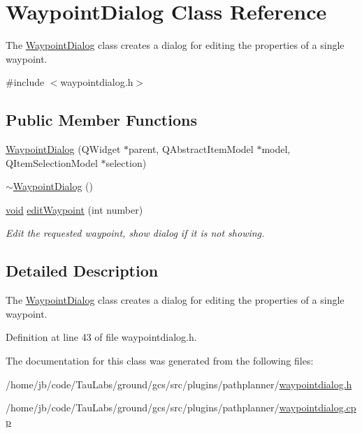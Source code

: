\hypertarget{class_waypoint_dialog}{\section{\-Waypoint\-Dialog \-Class \-Reference}
\label{class_waypoint_dialog}
}


\-The \hyperlink{class_waypoint_dialog}{\-Waypoint\-Dialog} class creates a dialog for editing the properties of a single waypoint.  




{\ttfamily \#include $<$waypointdialog.\-h$>$}

\subsection*{\-Public \-Member \-Functions}
\begin{DoxyCompactItemize}
\item 
\hyperlink{group___path_planner_ga79559741b9fcf0a36768f7df92746760}{\-Waypoint\-Dialog} (\-Q\-Widget $\ast$parent, \-Q\-Abstract\-Item\-Model $\ast$model, \-Q\-Item\-Selection\-Model $\ast$selection)
\item 
\hyperlink{group___path_planner_ga54d6efacbe7553519262195483f76ed5}{$\sim$\-Waypoint\-Dialog} ()
\item 
\hyperlink{group___u_a_v_objects_plugin_ga444cf2ff3f0ecbe028adce838d373f5c}{void} \hyperlink{group___path_planner_ga903050cdff8176aeedca31eae8b7ea02}{edit\-Waypoint} (int number)
\begin{DoxyCompactList}\small\item\em \-Edit the requested waypoint, show dialog if it is not showing. \end{DoxyCompactList}\end{DoxyCompactItemize}


\subsection{\-Detailed \-Description}
\-The \hyperlink{class_waypoint_dialog}{\-Waypoint\-Dialog} class creates a dialog for editing the properties of a single waypoint. 

\-Definition at line 43 of file waypointdialog.\-h.



\-The documentation for this class was generated from the following files\-:\begin{DoxyCompactItemize}
\item 
/home/jb/code/\-Tau\-Labs/ground/gcs/src/plugins/pathplanner/\hyperlink{waypointdialog_8h}{waypointdialog.\-h}\item 
/home/jb/code/\-Tau\-Labs/ground/gcs/src/plugins/pathplanner/\hyperlink{waypointdialog_8cpp}{waypointdialog.\-cpp}\end{DoxyCompactItemize}
